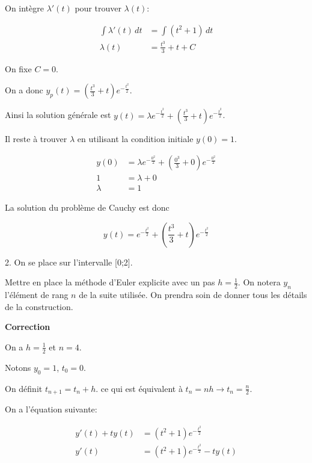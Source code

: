 \documentclass{article}
\newcommand{\correction}[0]{
    \vspace{1mm}
    \textbf{Correction}
    \hrulefill
}
\begin{document}
On intègre $\lambda'(t)$ pour trouver $\lambda(t)$:

\begin{align*}
    \int \lambda'(t) \, dt &= \int \left(t^2 + 1\right) \, dt \\
    \lambda(t) &= \frac{t^3}{3} + t + C
\end{align*}

On fixe $C = 0$.

On a donc $y_p(t) = \left(\frac{t^3}{3} + t\right) e^{-\frac{t^2}{2}}$.

Ainsi la solution générale est $y(t) = \lambda e^{-\frac{t^2}{2}} + \left(\frac{t^3}{3} + t\right) e^{-\frac{t^2}{2}}$.

Il reste à trouver $\lambda$ en utilisant la condition initiale $y(0) = 1$.

\begin{align*}
    y(0) &= \lambda e^{-\frac{0^2}{2}} + \left(\frac{0^3}{3} + 0\right) e^{-\frac{0^2}{2}} \\
    1 &= \lambda + 0 \\
    \lambda &= 1
\end{align*}

La solution du problème de Cauchy est donc 

\begin{equation*}
    y(t) = e^{-\frac{t^2}{2}} + \left(\frac{t^3}{3} + t\right) e^{-\frac{t^2}{2}}
\end{equation*}

\hrulefill

2. On se place sur l'intervalle [0;2].

Mettre en place la méthode d'Euler explicite avec un pas $h=\frac{1}{2}$.
On notera $y_n$ l'élément de rang $n$ de la suite utilisée.  On prendra soin
de donner tous les détails de la construction.

\correction

On a $h = \frac{1}{2}$ et $n = 4$.

Notons $y_0 = 1$, $t_0 = 0$.

On définit $t_{n+1} = t_n + h$.
ce qui est équivalent à $t_{n} = nh \rightarrow t_{n} = \frac{n}{2}$.

On a l'équation suivante:

\begin{align*}
    y'(t)+ty(t)&=\left(t^2+1\right)e^{-\frac{t^2}{2}} \\
    y'(t) &= \left(t^2+1\right)e^{-\frac{t^2}{2}} - ty(t)
\end{align*}
\end{document}
